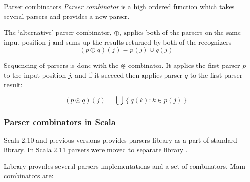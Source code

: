 \documentclass[t]{beamer}
\begin{document}
\begin{frame}{Parser combinators}
\emph{Parser combinator} is a high ordered function which takes several parsers and provides a
new parser.

The ‘alternative’ parser combinator, $\oplus$, applies both of the parsers on the same input
position j and sums up the results returned by both of the recognizers.
\begin{equation*}
(p \oplus q)(j) = p(j) \cup q(j)
\end{equation*}

Sequencing of parsers is done with the $\circledast$ combinator. It applies the first parser $p$
to the input position $j$, and if it succeed then applies parser $q$ to the first parser result:

\begin{equation*}
(p \circledast q)(j) = \bigcup \left\{q(k) : k \in p(j) \right\}
\end{equation*}

\end{frame}


\begin{frame}[fragile]
\frametitle{Parser combinators in Scala}
Scala 2.10 and previous versions provides parsers library as a part of standard library.
In Scala 2.11 parsers were moved to separate library .

Library provides several parsers implementations and a set of combinators.
Main combinators are:
\end{frame}
\end{document}
